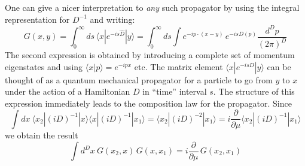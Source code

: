 \documentclass{article}
\def\bk#1#2#3{{\langle #1|#2|#3\rangle}}  %
\def\amp#1#2{\langle #1 | #2\rangle}      %
\begin{document}
One can give a nicer interpretation to \textit{any} such propagator by using the integral representation for $D^{-1}$ and writing:
\begin{equation}
 G(x,y)= \int_0^\infty ds \, \bk{x}{e^{-is\hat D}}{y} = \int_0^\infty ds \int e^{-ip\cdot (x-y)} \, e^{-isD(p)} \frac{d^D p}{(2\pi)^D}
 \label{onefourfive}
\end{equation} 
The second expression is obtained by introducing a complete set of momentum eigenstates and using $\amp{x}{p}=e^{-ipx}$ etc. The matrix element $\bk{x}{e^{-isD}}{y}$ can be thought of as a quantum mechanical propagator for a particle to go from $y$ to $x$ under the action of a Hamiltonian $D$ in ``time'' interval $s$. The structure of this expression immediately leads to the composition law for the propagator. Since  
\begin{equation}
 \int dx\ \bk{x_2}{(iD)^{-1}}{x} \bk{x}{(iD)^{-1}}{x_1} =  \bk{x_2}{(iD)^{-2}}{x_1} = i \frac{\partial}{\partial \mu } \bk{x_2}{(iD)^{-1}}{x_1}
\end{equation} 
we obtain the result 
\begin{equation}
 \int d^D x\ G(x_2,x) \, G(x, x_1) = i \frac{\partial}{\partial \mu }\,  G(x_2,x_1)
\end{equation} 
\end{document}
